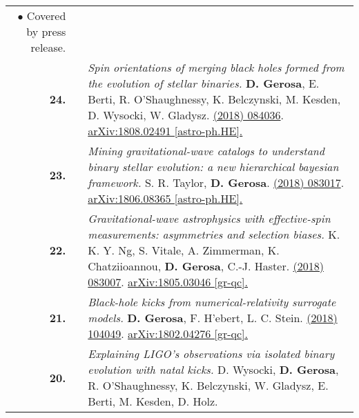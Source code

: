 {\begin{longtable}{rp{0.3cm}p{15.8cm}}
\newline{}
\textcolor{color1}{$\bullet$} Covered by press release.
\vspace{0.09cm}\\
%
\textbf{24.} & & \textit{Spin orientations of merging black holes formed from the evolution of stellar binaries.}
\newline{}
\textbf{D. Gerosa}, E. Berti, R. O'Shaughnessy, K. Belczynski, M. Kesden, D. Wysocki, W. Gladysz.
\newline{}
\href{https://journals.aps.org/prd/abstract/10.1103/PhysRevD.98.084036}{\prd 98 (2018) 084036}. \href{https://arxiv.org/abs/1808.02491}{arXiv:1808.02491 [astro-ph.HE].}
\vspace{0.09cm}\\
%
\textbf{23.} & & \textit{Mining gravitational-wave catalogs to understand binary stellar evolution: a new hierarchical bayesian framework.}
\newline{}
S. R. Taylor, \textbf{D. Gerosa}.
\newline{}
\href{https://journals.aps.org/prd/abstract/10.1103/PhysRevD.98.083017}{\prd 98 (2018) 083017}. \href{https://arxiv.org/abs/1806.08365}{arXiv:1806.08365 [astro-ph.HE].}
\vspace{0.09cm}\\
%
\textbf{22.} & & \textit{Gravitational-wave astrophysics with effective-spin measurements: asymmetries and selection biases.}
\newline{}
K. K. Y. Ng, S. Vitale, A. Zimmerman, K. Chatziioannou, \textbf{D. Gerosa}, C.-J. Haster.
\newline{}
\href{https://journals.aps.org/prd/abstract/10.1103/PhysRevD.98.083007}{\prd 98 (2018) 083007}. \href{https://arxiv.org/abs/1805.03046}{arXiv:1805.03046 [gr-qc].}
\vspace{0.09cm}\\
%
\textbf{21.} & & \textit{Black-hole kicks from numerical-relativity surrogate models.}
\newline{}
\textbf{D. Gerosa}, F. H'ebert, L. C. Stein.
\newline{}
\href{https://journals.aps.org/prd/abstract/10.1103/PhysRevD.97.104049}{\prd 97 (2018) 104049}. \href{https://arxiv.org/abs/1802.04276}{arXiv:1802.04276 [gr-qc].}
\vspace{0.09cm}\\
%
\textbf{20.} & & \textit{Explaining LIGO's observations via isolated binary evolution with natal kicks.}
\newline{}
D. Wysocki, \textbf{D. Gerosa}, R. O'Shaughnessy, K. Belczynski, W. Gladysz, E. Berti, M. Kesden, D. Holz.

\end{longtable}}
